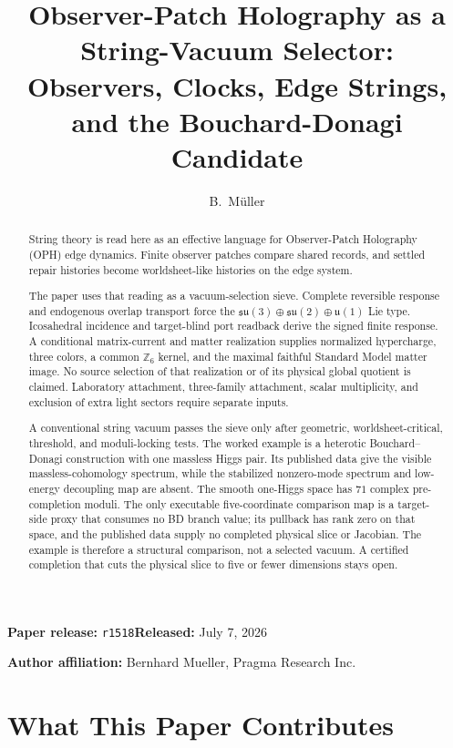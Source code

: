 \documentclass[11pt]{article}
\title{Observer-Patch Holography as a String-Vacuum Selector:\\
Observers, Clocks, Edge Strings, and the Bouchard-Donagi Candidate}
\author{B.\ M\"uller}
\date{\OPHPaperReleaseDate}
\newcommand{\OPHPaperReleaseID}{r1518}%
\newcommand{\OPHPaperReleaseDate}{July 7, 2026}%
\newcommand{\OPHPaperReleaseBanner}{%
        \begin{center}
        \small\textbf{Paper release:} \texttt{\OPHPaperReleaseID}\quad\textbf{Released:} \OPHPaperReleaseDate
        \end{center}}
\theoremstyle{remark}
\theoremstyle{plain}
\begin{document}
\maketitle
\OPHPaperReleaseBanner

\begin{center}
\small\textbf{Author affiliation:} Bernhard Mueller, Pragma Research Inc.
\end{center}

\begin{abstract}
String theory is read here as an effective language for Observer-Patch
Holography (OPH) edge dynamics. Finite observer patches compare shared records,
and settled repair histories become worldsheet-like histories on the edge
system.

The paper uses that reading as a vacuum-selection sieve. Complete reversible
response and endogenous overlap transport force the
\(\mathfrak{su}(3)\oplus\mathfrak{su}(2)\oplus\mathfrak u(1)\) Lie type.
Icosahedral incidence and target-blind port readback derive the signed finite
response. A conditional matrix-current and matter realization supplies
normalized hypercharge, three colors, a common \(\mathbb Z_6\) kernel, and
the maximal faithful Standard Model matter image. No source selection of that
realization or of its physical global quotient is claimed. Laboratory attachment,
three-family attachment, scalar multiplicity, and exclusion of extra light
sectors require separate inputs.

A conventional string vacuum passes the sieve only after geometric,
worldsheet-critical, threshold, and moduli-locking tests. The worked example
is a heterotic Bouchard--Donagi construction with one massless Higgs pair.
Its published data give the visible massless-cohomology spectrum, while the
stabilized nonzero-mode spectrum and low-energy decoupling map are absent.
The smooth one-Higgs space has \(71\) complex pre-completion moduli. The
only executable five-coordinate comparison map is a target-side proxy that
consumes no BD branch value; its pullback has rank zero on that space, and the
published data supply no completed physical slice or Jacobian. The example is
therefore a structural comparison, not a selected vacuum. A certified
completion that cuts the physical slice to five or fewer dimensions stays open.
\end{abstract}

\section*{What This Paper Contributes}
\end{document}
